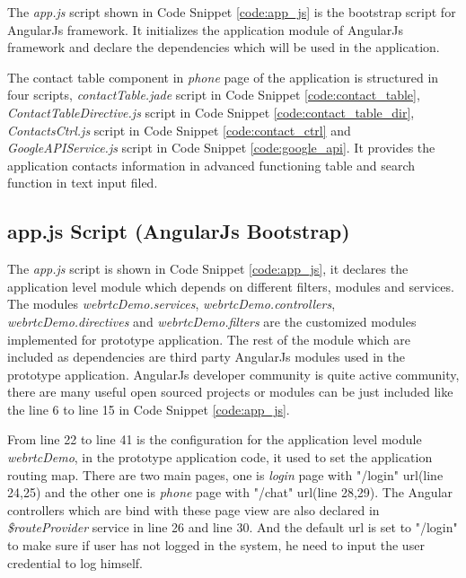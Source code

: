 \par The \textit{app.js} script shown in Code Snippet \ref{code:app_js} is the bootstrap script for AngularJs framework. It initializes the application module of AngularJs framework and declare the dependencies which will be used in the application.

\par The contact table component in \textit{phone} page of the application is structured in four scripts, \textit{contactTable.jade} script in Code Snippet \ref{code:contact_table}, \textit{ContactTableDirective.js} script in Code Snippet \ref{code:contact_table_dir}, \textit{ContactsCtrl.js} script in Code Snippet \ref{code:contact_ctrl} and \textit{GoogleAPIService.js} script in Code Snippet \ref{code:google_api}. It provides the application contacts information in advanced functioning table and search function in text input filed.

\subsection{app.js Script (AngularJs Bootstrap)}

\par The \textit{app.js} script is shown in Code Snippet \ref{code:app_js}, it declares the application level module which depends on different filters, modules and services. The modules \textit{webrtcDemo.services}, \textit{webrtcDemo.controllers}, \textit{webrtcDemo.directives} and \textit{webrtcDemo.filters} are the customized modules implemented for prototype application. The rest of the module which are included as dependencies are third party AngularJs modules used in the prototype application. AngularJs developer community is quite active community, there are many useful open sourced projects or modules can be just included like the line 6 to line 15 in Code Snippet \ref{code:app_js}.

\par From line 22 to line 41 is the configuration for the application level module \textit{webrtcDemo}, in the prototype application code, it used to set the application routing map. There are two main pages, one is \textit{login} page with "/login" \gls{url}(line 24,25) and the other one is \textit{phone} page with "/chat" \gls{url}(line 28,29). The Angular controllers which are bind with these page view are also declared in \textit{\$routeProvider} service in line 26 and line 30. And the default \gls{url} is set to "/login" to make sure if user has not logged in the system, he need to input the user credential to log himself.

